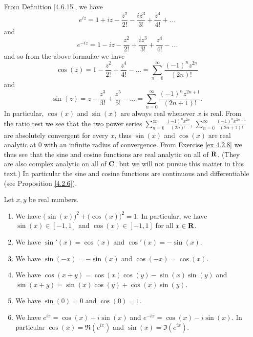 \begin{additional corollary}\label{ac 4.7.1}
From Definition \ref{4.6.15}, we have
\[
    e^{i z} = 1 + i z - \frac{z^2}{2!} - \frac{i z^3}{3!} + \frac{z^4}{4!} + \dots
\]
and
\[
    e^{- i z} = 1 - i z - \frac{z^2}{2!} + \frac{i z^3}{3!} + \frac{z^4}{4!} - \dots
\]
and so from the above formulae we have
\[
    \cos(z) = 1 - \frac{z^2}{2!} + \frac{z^4}{4!} - \dots = \sum_{n = 0}^\infty \frac{(-1)^n z^{2n}}{(2n)!}
\]
and
\[
    \sin(z) = z - \frac{z^3}{3!} + \frac{z^5}{5!} - \dots = \sum_{n = 0}^\infty \frac{(-1)^n z^{2n + 1}}{(2n + 1)!}.
\]
In particular, \(\cos(x)\) and \(\sin(x)\) are always real whenever \(x\) is real.
From the ratio test we see that the two power series \(\sum_{n = 0}^\infty \frac{(-1)^n x^{2n}}{(2n)!}\), \(\sum_{n = 0}^\infty \frac{(-1)^n x^{2n + 1}}{(2n + 1)!}\) are absolutely convergent for every \(x\), thus \(\sin(x)\) and \(\cos(x)\) are real analytic at \(0\) with an infinite radius of convergence.
From Exercise \ref{ex 4.2.8} we thus see that the sine and cosine functions are real analytic on all of \(\mathbf{R}\).
(They are also complex analytic on all of \(\mathbf{C}\), but we will not pursue this matter in this text.)
In particular the sine and cosine functions are continuous and differentiable (see Proposition \ref{4.2.6}).
\end{additional corollary}

\begin{theorem}\label{4.7.2}
    Let \(x, y\) be real numbers.
    \begin{enumerate}
        \item We have \(\big(\sin(x)\big)^2 + \big(\cos(x)\big)^2 = 1\).
              In particular, we have \(\sin(x) \in [-1, 1]\) and \(\cos(x) \in [-1, 1]\) for all \(x \in \mathbf{R}\).
        \item We have \(\sin'(x) = \cos(x)\) and \(\cos'(x) = -\sin(x)\).
        \item We have \(\sin(-x) = -\sin(x)\) and \(\cos(-x) = \cos(x)\).
        \item We have \(\cos(x + y) = \cos(x) \cos(y) - \sin(x) \sin(y)\) and \(\sin(x + y) = \sin(x) \cos(y) + \cos(x) \sin(y)\).
        \item We have \(\sin(0) = 0\) and \(\cos(0) = 1\).
        \item We have \(e^{i x} = \cos(x) + i \sin(x)\) and \(e^{- i x} = \cos(x) - i \sin(x)\).
              In particular \(\cos(x) = \Re(e^{i x})\) and \(\sin(x) = \Im(e^{i x})\).
    \end{enumerate}
\end{theorem}

